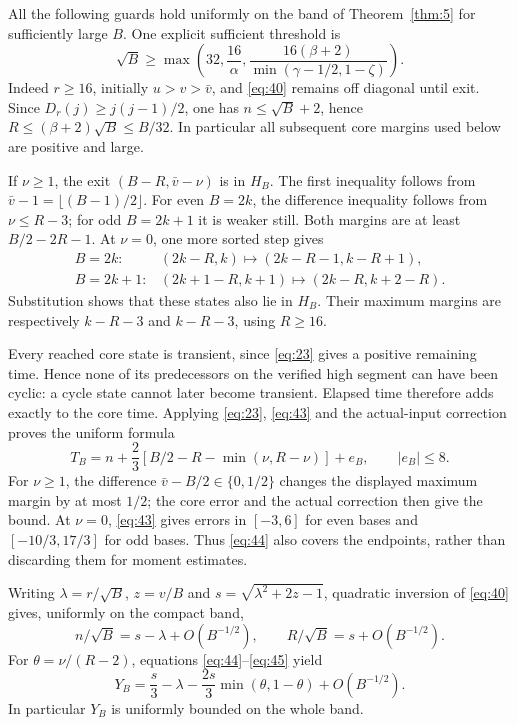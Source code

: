 \documentclass[11pt]{amsart}
\begin{document}
All the following guards hold uniformly on the band of Theorem~\ref{thm:5} for sufficiently large \(B\). One explicit sufficient threshold is \begin{equation}\label{eq:42}
\sqrt B\ge\max\left(32,\frac{16}\alpha,
             \frac{16(\beta+2)}{\min(\gamma-1/2,1-\zeta)}\right).
\end{equation} Indeed \(r\ge16\), initially \(u>v>\bar v\), and \eqref{eq:40} remains off diagonal until exit. Since \(D_r(j)\ge j(j-1)/2\), one has \(n\le\sqrt B+2\), hence \(R\le(\beta+2)\sqrt B\le B/32\). In particular all subsequent core margins used below are positive and large.

If \(\nu\ge1\), the exit \((B-R,\bar v-\nu)\) is in \(H_B\). The first inequality follows from \(\bar v-1=\lfloor(B-1)/2\rfloor\). For even \(B=2k\), the difference inequality follows from \(\nu\le R-3\); for odd \(B=2k+1\) it is weaker still. Both margins are at least \(B/2-2R-1\). At \(\nu=0\), one more sorted step gives \begin{equation}\label{eq:43}
\begin{array}{ll}
 B=2k:&(2k-R,k)\mapsto(2k-R-1,k-R+1),\\
 B=2k+1:&(2k+1-R,k+1)\mapsto(2k-R,k+2-R).
 \end{array}
\end{equation} Substitution shows that these states also lie in \(H_B\). Their maximum margins are respectively \(k-R-3\) and \(k-R-3\), using \(R\ge16\).

Every reached core state is transient, since \eqref{eq:23} gives a positive remaining time. Hence none of its predecessors on the verified high segment can have been cyclic: a cycle state cannot later become transient. Elapsed time therefore adds exactly to the core time. Applying \eqref{eq:23}, \eqref{eq:43} and the actual-input correction proves the uniform formula \begin{equation}\label{eq:44}
T_B=n+\frac23\left[B/2-R-\min(\nu,R-\nu)\right]+e_B,
 \qquad |e_B|\le8.
\end{equation} For \(\nu\ge1\), the difference \(\bar v-B/2\in\{0,1/2\}\) changes the displayed maximum margin by at most \(1/2\); the core error and the actual correction then give the bound. At \(\nu=0\), \eqref{eq:43} gives errors in \([-3,6]\) for even bases and \([-10/3,17/3]\) for odd bases. Thus \eqref{eq:44} also covers the endpoints, rather than discarding them for moment estimates.

Writing \(\lambda=r/\sqrt B\), \(z=v/B\) and \(s=\sqrt{\lambda^2+2z-1}\), quadratic inversion of \eqref{eq:40} gives, uniformly on the compact band, \begin{equation}\label{eq:45}
n/\sqrt B=s-\lambda+O(B^{-1/2}),\qquad
 R/\sqrt B=s+O(B^{-1/2}).
\end{equation} For \(\theta=\nu/(R-2)\), equations \eqref{eq:44}--\eqref{eq:45} yield \begin{equation}\label{eq:46}
Y_B=\frac{s}3-\lambda-\frac{2s}3\min(\theta,1-\theta)
                      +O(B^{-1/2}).
\end{equation} In particular \(Y_B\) is uniformly bounded on the whole band.
\end{document}

